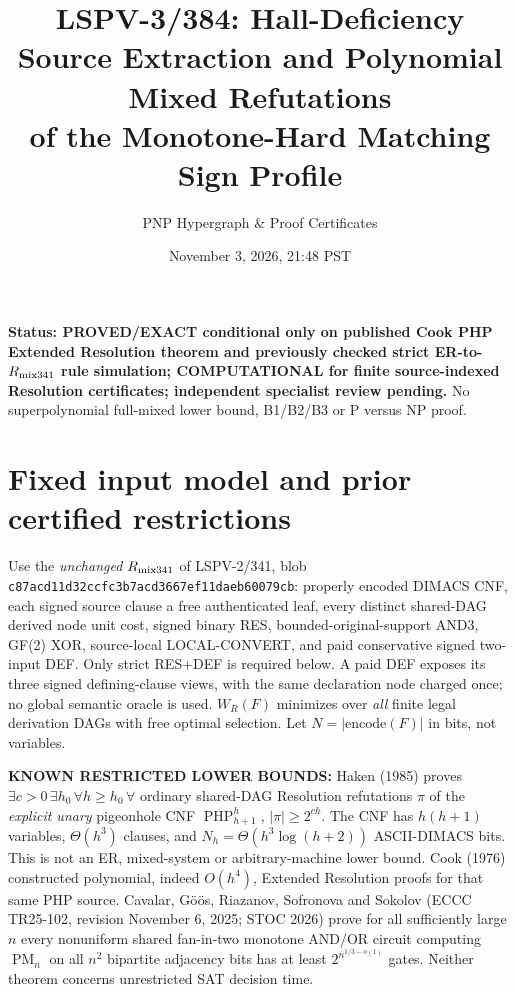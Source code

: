 \documentclass[11pt]{article}
\title{LSPV-3/384: Hall-Deficiency Source Extraction and Polynomial Mixed Refutations\\of the Monotone-Hard Matching Sign Profile}
\author{PNP Hypergraph \& Proof Certificates}
\date{November 3, 2026, 21:48 PST}
\begin{document}
\maketitle
\noindent\textbf{Status: PROVED/EXACT conditional only on published Cook PHP Extended Resolution theorem and previously checked strict ER-to-$R_{\rm mix341}$ rule simulation; COMPUTATIONAL for finite source-indexed Resolution certificates; independent specialist review pending.} No superpolynomial full-mixed lower bound, B1/B2/B3 or P versus NP proof.

\section*{Fixed input model and prior certified restrictions}
Use the \emph{unchanged} $R_{\rm mix341}$ of LSPV-2/341, blob \texttt{c87acd11d32ccfc3b7acd3667ef11daeb60079cb}: properly encoded DIMACS CNF, each signed source clause a free authenticated leaf, every distinct shared-DAG derived node unit cost, signed binary RES, bounded-original-support AND3, GF(2) XOR, source-local LOCAL-CONVERT, and paid conservative signed two-input DEF. Only strict RES+DEF is required below. A paid DEF exposes its three signed defining-clause views, with the same declaration node charged once; no global semantic oracle is used. $W_R(F)$ minimizes over \emph{all} finite legal derivation DAGs with free optimal selection. Let $N=|\mathrm{encode}(F)|$ in bits, not variables.

\noindent\textbf{KNOWN RESTRICTED LOWER BOUNDS:}
Haken (1985) proves $\exists c>0\,\exists h_0\,\forall h\ge h_0\,\forall$ ordinary shared-DAG Resolution refutations $\pi$ of the \emph{explicit unary} pigeonhole CNF $\operatorname{PHP}_{h+1}^h$, $|\pi|\ge2^{ch}$. The CNF has $h(h+1)$ variables, $\Theta(h^3)$ clauses, and $N_h=\Theta(h^3\log(h+2))$ ASCII-DIMACS bits. This is not an ER, mixed-system or arbitrary-machine lower bound. Cook (1976) constructed polynomial, indeed $O(h^4)$, Extended Resolution proofs for that same PHP source. Cavalar, G\"o\"os, Riazanov, Sofronova and Sokolov (ECCC TR25-102, revision November 6, 2025; STOC 2026) prove for all sufficiently large $n$ every nonuniform shared fan-in-two monotone AND/OR circuit computing $\operatorname{PM}_n$ on all $n^2$ bipartite adjacency bits has at least $2^{n^{1/3-o(1)}}$ gates. Neither theorem concerns unrestricted SAT decision time.
\end{document}
